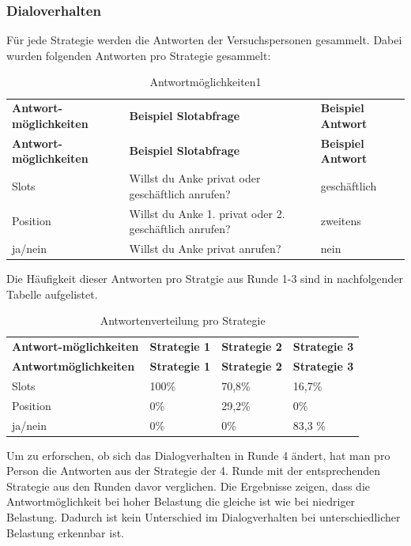 \documentclass[12pt,a4paper]{scrartcl}
\begin{document}
\subsubsection{Dialoverhalten}
Für jede Strategie werden die Antworten der Versuchspersonen gesammelt. Dabei wurden folgenden Antworten pro Strategie gesammelt:
\begin{longtable}{p{4cm}p{4cm}p{4cm}}
	\label{Dialogverhalten11}\\
	\caption[Antwortmöglichkeiten1]{Antwortmöglichkeiten1}\\
	\hline
\textbf{Antwort-möglichkeiten}&\textbf{Beispiel \newline Slotabfrage}&\textbf{Beispiel \newline Antwort}\\
	\hline
	\endfirsthead
	\hline
	\textbf{Antwort-möglichkeiten}&\textbf{Beispiel \newline Slotabfrage}&\textbf{Beispiel \newline Antwort}\\
	\hline
	\endhead
Slots  & Willst du Anke privat oder geschäftlich anrufen? & geschäftlich  \\
Position & Willst du Anke 1. privat oder 2. geschäftlich anrufen? & zweitens  \\
ja/nein & Willst du Anke privat anrufen? &  nein\\ 
\hline
\end{longtable}

Die Häufigkeit dieser Antworten pro Stratgie aus Runde 1-3 sind in nachfolgender Tabelle aufgelistet.

\begin{longtable}{p{3cm}p{3cm}p{3cm}p{3cm} }
	\label{Dialogverhalten12}\\
	\caption[Antwortenverteilung pro Strategie]{Antwortenverteilung pro Strategie}\\
	\hline
\textbf{Antwort-möglichkeiten}&\textbf{Strategie 1}&\textbf{Strategie 2} &\textbf{Strategie 3}\\
	\hline
	\endfirsthead
	\hline
	\textbf{Antwortmöglichkeiten}&\textbf{Strategie 1}&\textbf{Strategie 2} &\textbf{Strategie 3}\\
	\hline
	\endhead
Slots & 100\% & 70,8\%\ & 16,7\%  \\
Position & 0\% & 29,2\% & 0\%  \\
ja/nein & 0\% & 0\%  & 83,3 \%  \\
\hline
\end{longtable}

Um zu erforschen, ob sich das Dialogverhalten in Runde 4 ändert, hat man pro Person die Antworten aus der Strategie der 4. Runde mit der entsprechenden Strategie aus den Runden davor verglichen. Die Ergebnisse zeigen, dass die Antwortmöglichkeit bei hoher Belastung die gleiche ist wie bei niedriger Belastung. Dadurch ist kein Unterschied im Dialogverhalten bei unterschiedlicher Belastung erkennbar ist. 
\end{document}
